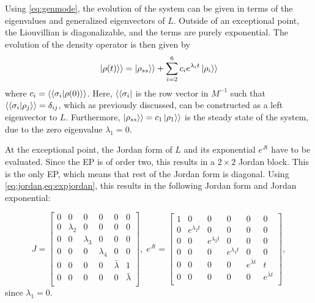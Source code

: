 \documentclass[../main.tex]{subfiles}
\begin{document}
Using \cref{eq:genmode}, the evolution of the system can be given in terms of the eigenvalues and generalized eigenvectors of $L$. Outside of an exceptional point, the Liouvillian is diagonalizable, and the terms are purely exponential. The evolution of the density operator is then given by
\begin{equation}\label{eq:dynnonep}
    \ket{\rho(t)}\rangle = \ket{\rho_{ss}}\rangle + \sum_{i=2}^6 c_i e^{\lambda_i t} \ket{\rho_i}\rangle
\end{equation}
where $c_i = \langle\braket{\sigma_i|\rho(0)}\rangle$. Here, $\langle\bra{\sigma_i}$ is the row vector in $M^{-1}$ such that $\langle\braket{\sigma_i|\rho_j}\rangle=\delta_{ij}$, which as previously discussed, can be constructed as a left eigenvector to $L$. Furthermore, $\ket{\rho_{ss}}\rangle = c_1 \ket{\rho_1}\rangle$ is the steady state of the system, due to the zero eigenvalue $\lambda_1=0$.

At the exceptional point, the Jordan form of $L$ and its exponential $e^{Jt}$ have to be evaluated. Since the EP is of order two, this results in a $2\times2$ Jordan block. This is the only EP, which means that rest of the Jordan form is diagonal. Using \cref{eq:jordan,eq:expjordan}, this results in the following Jordan form and Jordan exponential:

\begin{equation}
    J = \begin{bmatrix} 0 & 0 & 0 & 0 & 0 & 0 \\
                        0 & \lambda_2 & 0 & 0 & 0 & 0 \\
                        0 & 0 & \lambda_3 & 0 & 0 & 0 \\
                        0 & 0 & 0 & \lambda_4 & 0 & 0 \\
                        0 & 0 & 0 & 0 & \bar \lambda & 1 \\
                        0 & 0 & 0 & 0 & 0 & \bar \lambda \\ \end{bmatrix}, \; 
        e^{Jt} = \begin{bmatrix} 1 & 0 & 0 & 0 & 0 & 0 \\
            0 & e^{\lambda_2t} & 0 & 0 & 0 & 0 \\
            0 & 0 & e^{\lambda_3t} & 0 & 0 & 0 \\
            0 & 0 & 0 & e^{\lambda_4t} & 0 & 0 \\
            0 & 0 & 0 & 0 & e^{\bar \lambda t} & t \\
        0 & 0 & 0 & 0 & 0 & e^{\bar \lambda t} \\ \end{bmatrix},
\end{equation}
since $\lambda_1 = 0$.
\end{document}
